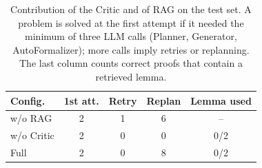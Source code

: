 \begin{table}[t]
\centering
\caption{Contribution of the Critic and of RAG on the test set. A problem is solved at the first attempt if it needed the minimum of three LLM calls (Planner, Generator, AutoFormalizer); more calls imply retries or replanning. The last column counts correct proofs that contain a retrieved lemma.}
\label{tab:critic}
\footnotesize
\setlength{\tabcolsep}{3pt}
\begin{tabular}{lcccc}
\hline
Config. & 1st att. & Retry & Replan & Lemma used \\
\hline
w/o RAG & 2 & 1 & 6 & -- \\
w/o Critic & 2 & 0 & 0 & 0/2 \\
Full & 2 & 0 & 8 & 0/2 \\
\hline
\end{tabular}
\end{table}

